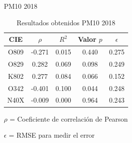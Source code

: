 \documentclass[11pt]{beamer}
\begin{document}
\begin{frame}{PM10 2018}
\begin{table}[hbt!]
\centering
\caption{Resultados obtenidos PM10 2018}
\label{tab:Resultados obtenidos PM10 2018}
\vspace{0.5cm}
\begin{tabular}{|c|c|c|c|c|}
	\hline
	CIE & $\rho$ & $R^2$ & Valor $p$ & $\epsilon$\\
	\hline
	O809 & -0.271 & 0.015 & 0.440 & 0.275 \\
	\hline
	O829 & 0.282 & 0.069 & 0.098 & 0.249 \\
	\hline
	K802 & 0.277 & 0.084 & 0.066 & 0.152 \\
	\hline
	O342 & -0.401 & 0.100 & 0.044 & 0.248 \\
	\hline
	N40X & -0.009 & 0.000 & 0.964 & 0.243 \\
	\hline
\end{tabular}
\footnotesize
\item{$\rho$ = Coeficiente de correlación de Pearson}
\item{$\epsilon$ = RMSE para medir el error}
\end{table}
\end{frame}
\end{document}
